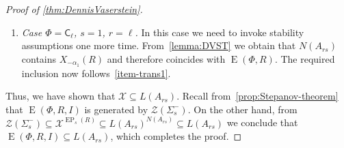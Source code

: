 \documentclass[11pt]{amsart}
\theoremstyle{plain}
\numberwithin{equation}{section}
\numberwithin{lemma}{section}
\theoremstyle{definition}
\theoremstyle{remark}
\DeclareMathOperator{\E}{E}
\DeclareMathOperator{\EP}{EP}
\newcommand{\rC}{\mathsf{C}}
\begin{document}
\begin{proof} [Proof of \cref{thm:DennisVaserstein}]
\begin{enumerate}
 Since $\alpha \in \Phi^+$, $\beta, \beta + 2\alpha \in O$ we obtain the inclusion $X_{\gamma}(I) \subseteq L(A_{rs})$ by the same token as in the previous case.
 \item \textit{Case $\Phi = \rC_\ell$, $s=1$, $r=\ell$.} 
  In this case we need to invoke stability assumptions one more time.
  From~\cref{lemma:DVST} we obtain that $N(A_{rs})$ contains $X_{-\alpha_1}(R)$ and therefore coincides with $\E(\Phi, R)$.
  The required inclusion now follows~\cref{item-trans1}.
\end{enumerate}
Thus, we have shown that $\mathcal{X}\subseteq L(A_{rs})$. 
Recall from~\cref{prop:Stepanov-theorem} that $\E(\Phi, R, I)$ is generated by $\mathcal{Z}(\Sigma_s^-)$.
On the other hand, from $\mathcal{Z}(\Sigma_s^-) \subseteq \mathcal{X}^{\EP_s(R)} \subseteq L(A_{rs})^{N(A_{rs})} \subseteq L(A_{rs})$ we conclude that 
 $\E(\Phi, R, I) \subseteq L(A_{rs})$, which completes the proof.
\end{proof}
\end{document}
